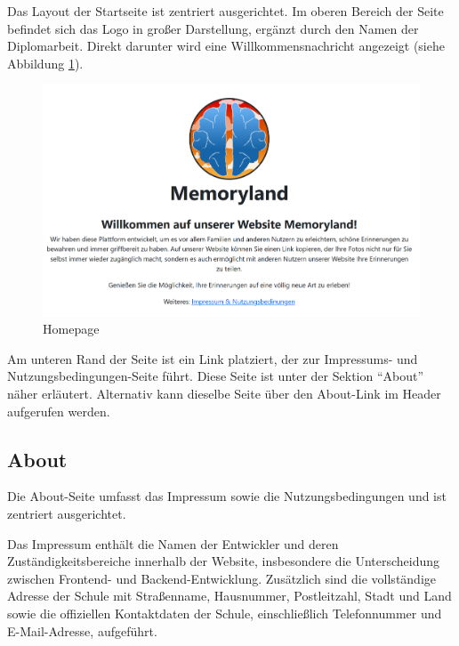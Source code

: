 Das Layout der Startseite ist zentriert ausgerichtet. Im oberen Bereich der Seite befindet 
sich das Logo in gro\ss{}er Darstellung, ergänzt durch den Namen der Diplomarbeit. Direkt 
darunter wird eine Willkommensnachricht angezeigt (siehe Abbildung \ref{fig:homepage}).

\begin{figure} [h t]
    \centering
    \includegraphics[scale=0.4]{pics/home_page.PNG}
    \caption{Homepage}
    \label{fig:homepage}
\end{figure}

Am unteren Rand der Seite ist ein Link platziert, der zur Impressums- und 
Nutzungsbedingungen-Seite führt. Diese Seite ist unter der Sektion ``About'' 
näher erläutert. Alternativ kann dieselbe Seite über den About-Link im Header 
aufgerufen werden.

\subsection{About}

Die About-Seite umfasst das Impressum sowie die Nutzungsbedingungen und ist zentriert 
ausgerichtet.


Das Impressum enthält die Namen der Entwickler und deren Zuständigkeitsbereiche 
innerhalb der Website, insbesondere die Unterscheidung zwischen Frontend- und 
Backend-Entwicklung. Zusätzlich sind die vollständige Adresse der Schule mit 
Stra\ss{}enname, Hausnummer, Postleitzahl, Stadt und Land sowie die offiziellen 
Kontaktdaten der Schule, einschlie\ss{}lich Telefonnummer und E-Mail-Adresse, 
aufgeführt.

